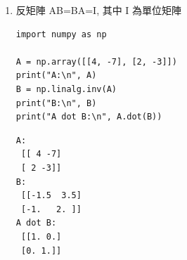 \documentclass[a4paper,12pt]{article}
\begin{document}
\begin{enumerate}
\begin{verbatim}
[[14 -1]
 [16  6]]
\end{verbatim}

\begin{itemize}
\item 相對位置乘法\\
\end{itemize}
\lstset{breaklines=true,language=Python,label= ,caption= ,captionpos=b,firstnumber=1,numbers=left}
\begin{lstlisting}
import numpy as np
A = np.array([[1, 2], [4, 5]])
B = np.array([[7, 8], [9, 10]])
print("A:\n{0}".format(A))
print("B:\n{0}".format(A))
print("A*B:\n{0}".format(A*B))

\end{lstlisting}

\begin{verbatim}
A:
[[1 2]
 [4 5]]
B:
[[1 2]
 [4 5]]
A*B:
[[ 7 16]
 [36 50]]
\end{verbatim}

\begin{itemize}
\item 取代矩陣中元素\\
\end{itemize}
\lstset{breaklines=true,language=Python,label= ,caption= ,captionpos=b,firstnumber=1,numbers=left}
\begin{lstlisting}
import numpy as np

C = np.array([5, -1, 3, 9, 0])
print(C<=0)
# 將矩陣中小於等於0的元素取代為0;其他轉為1
C[C<=0] = 0
C[C>0] = 1
print(C)
\end{lstlisting}

\begin{verbatim}
[False  True False False  True]
[1 0 1 1 0]
\end{verbatim}

\item 反矩陣
\label{sec:orgfcff059}
AB=BA=I, 其中 I 為單位矩陣\\
\lstset{breaklines=true,language=Python,label= ,caption= ,captionpos=b,firstnumber=1,numbers=left}
\begin{lstlisting}
import numpy as np

A = np.array([[4, -7], [2, -3]])
print("A:\n", A)
B = np.linalg.inv(A)
print("B:\n", B)
print("A dot B:\n", A.dot(B))
\end{lstlisting}

\begin{verbatim}
A:
 [[ 4 -7]
 [ 2 -3]]
B:
 [[-1.5  3.5]
 [-1.   2. ]]
A dot B:
 [[1. 0.]
 [0. 1.]]
\end{verbatim}
\end{enumerate}
\end{document}
